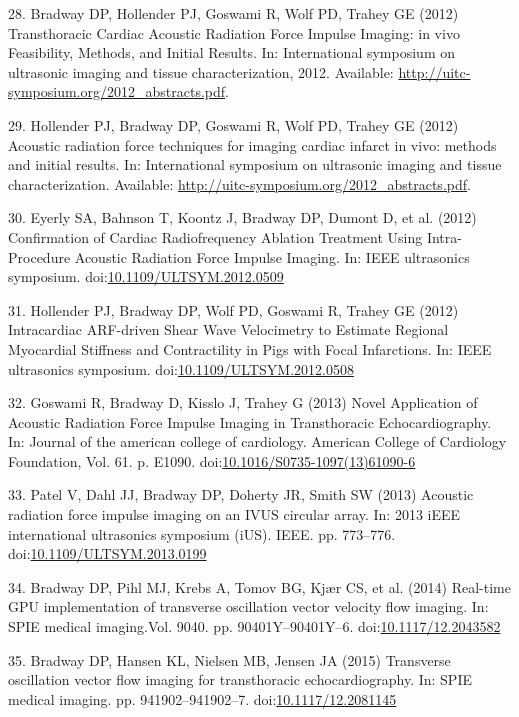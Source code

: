 \documentclass[]{article}
\begin{document}
28. Bradway DP, Hollender PJ, Goswami R, Wolf PD, Trahey GE (2012)
Transthoracic Cardiac Acoustic Radiation Force Impulse Imaging: in vivo
Feasibility, Methods, and Initial Results. In: International symposium
on ultrasonic imaging and tissue characterization, 2012. Available:
\url{http://uitc-symposium.org/2012_abstracts.pdf}.

29. Hollender PJ, Bradway DP, Goswami R, Wolf PD, Trahey GE (2012)
Acoustic radiation force techniques for imaging cardiac infarct in vivo:
methods and initial results. In: International symposium on ultrasonic
imaging and tissue characterization. Available:
\url{http://uitc-symposium.org/2012_abstracts.pdf}.

30. Eyerly SA, Bahnson T, Koontz J, Bradway DP, Dumont D, et al. (2012)
Confirmation of Cardiac Radiofrequency Ablation Treatment Using
Intra-Procedure Acoustic Radiation Force Impulse Imaging. In: IEEE
ultrasonics symposium.
doi:\href{http://dx.doi.org/10.1109/ULTSYM.2012.0509}{10.1109/ULTSYM.2012.0509}

31. Hollender PJ, Bradway DP, Wolf PD, Goswami R, Trahey GE (2012)
Intracardiac ARF-driven Shear Wave Velocimetry to Estimate Regional
Myocardial Stiffness and Contractility in Pigs with Focal Infarctions.
In: IEEE ultrasonics symposium.
doi:\href{http://dx.doi.org/10.1109/ULTSYM.2012.0508}{10.1109/ULTSYM.2012.0508}

32. Goswami R, Bradway D, Kisslo J, Trahey G (2013) Novel Application of
Acoustic Radiation Force Impulse Imaging in Transthoracic
Echocardiography. In: Journal of the american college of cardiology.
American College of Cardiology Foundation, Vol. 61. p. E1090.
doi:\href{http://dx.doi.org/10.1016/S0735-1097(13)61090-6}{10.1016/S0735-1097(13)61090-6}

33. Patel V, Dahl JJ, Bradway DP, Doherty JR, Smith SW (2013) Acoustic
radiation force impulse imaging on an IVUS circular array. In: 2013 iEEE
international ultrasonics symposium (iUS). IEEE. pp. 773--776.
doi:\href{http://dx.doi.org/10.1109/ULTSYM.2013.0199}{10.1109/ULTSYM.2013.0199}

34. Bradway DP, Pihl MJ, Krebs A, Tomov BG, Kjær CS, et al. (2014)
Real-time GPU implementation of transverse oscillation vector velocity
flow imaging. In: SPIE medical imaging.Vol. 9040. pp. 90401Y--90401Y--6.
doi:\href{http://dx.doi.org/10.1117/12.2043582}{10.1117/12.2043582}

35. Bradway DP, Hansen KL, Nielsen MB, Jensen JA (2015) Transverse
oscillation vector flow imaging for transthoracic echocardiography. In:
SPIE medical imaging. pp. 941902--941902--7.
doi:\href{http://dx.doi.org/10.1117/12.2081145}{10.1117/12.2081145}
\end{document}
